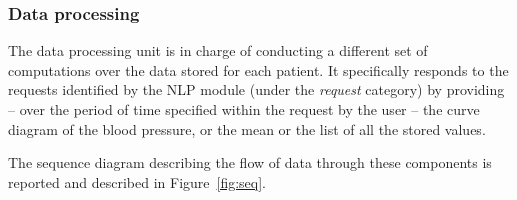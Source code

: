 \documentclass[preprint,12pt]{elsarticle}
\newcommand{\sara}[1]{{\color{red}{\textbf{[Sara]}~#1}}}
\begin{document}




\subsubsection{Data processing}

The data processing unit is in charge of conducting a different set of computations over the data stored for each patient.
%
It specifically responds to the requests identified by the NLP module (under the \emph{request} category) by providing -- over the period of time specified within the request by the user -- the curve diagram of the blood pressure, or the mean or the list of all the stored values.

\vspace{5pt}
\noindent The sequence diagram describing the flow of data through these components is reported and described in Figure~\ref{fig:seq}.
\end{document}
